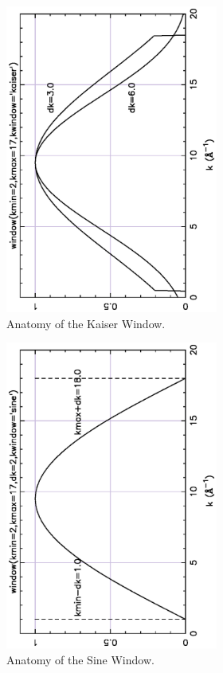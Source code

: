 \begin{figure}[tb] \begin{center}
  \includegraphics[width=2.75in,angle=-90]{figs/win_kaiser.ps}
  \caption{ Anatomy of the Kaiser Window.}\label{Fig:WinKaiser}
\end{center} \end{figure}

\begin{figure}[tb] \begin{center}
  \includegraphics[width=2.75in,angle=-90]{figs/win_sine.ps}
  \caption{ Anatomy of the Sine Window.}\label{Fig:WinSine}
\end{center} \end{figure}

